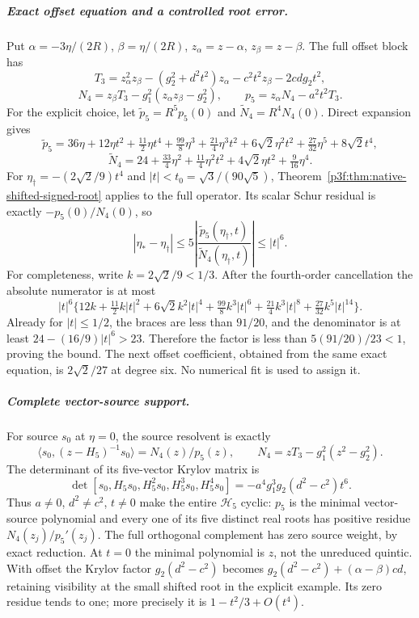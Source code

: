 \documentclass[11pt,a4paper]{article}
\begin{document}
\subparagraph{Exact offset equation and a controlled root error.}
Put \(\alpha=-3\eta/(2R)\), \(\beta=\eta/(2R)\),
\(z_\alpha=z-\alpha\), \(z_\beta=z-\beta\). The full offset block has
\[
 T_3=z_\alpha^2z_\beta-(g_2^2+d^2t^2)z_\alpha
                   -c^2t^2z_\beta-2cdg_2t^2,
\]
\[
 N_4=z_\beta T_3-g_1^2(z_\alpha z_\beta-g_2^2),\qquad
 p_5=z_\alpha N_4-a^2t^2T_3.
\]
For the explicit choice, let \(\widetilde p_5=R^5p_5(0)\) and
\(\widetilde N_4=R^4N_4(0)\). Direct expansion gives
\[
 \widetilde p_5=
 36\eta+12\eta t^2+\tfrac{11}{2}\eta t^4
 +\tfrac{99}{8}\eta^3+\tfrac{21}{4}\eta^3t^2
 +6\sqrt2\eta^2t^2+\tfrac{27}{32}\eta^5+8\sqrt2t^4,
\]
\[
 \widetilde N_4=24+\tfrac{33}{4}\eta^2+\tfrac{11}{4}\eta^2t^2
                     +4\sqrt2\eta t^2+\tfrac9{16}\eta^4.
\]
For \(\eta_{\dagger}=-(2\sqrt2/9)t^4\) and
\(|t|<t_0=\sqrt3/(90\sqrt5)\), Theorem~\ref{p3f:thm:native-shifted-signed-root}
applies to the full operator. Its scalar Schur residual is exactly
\(-p_5(0)/N_4(0)\), so
\begin{equation}
 |\eta_*-\eta_{\dagger}|\le
 5\left|\frac{\widetilde p_5(\eta_{\dagger},t)}
                  {\widetilde N_4(\eta_{\dagger},t)}\right|
 \le |t|^6.
 \label{p3f:eq:native-mixed-root-sixth-bound}
\end{equation}
For completeness, write \(k=2\sqrt2/9<1/3\). After the fourth-order
cancellation the absolute numerator is at most
\[
 |t|^6\{12k+\tfrac{11}{2}k|t|^2+6\sqrt2k^2|t|^4
 +\tfrac{99}{8}k^3|t|^6+\tfrac{21}{4}k^3|t|^8
 +\tfrac{27}{32}k^5|t|^{14}\}.
\]
Already for \(|t|\le1/2\), the braces are less than \(91/20\), and
the denominator is at least \(24-(16/9)|t|^6>23\).
Therefore the factor is less than \(5(91/20)/23<1\), proving the bound.
The next offset coefficient, obtained from the same exact equation, is
\(2\sqrt2/27\) at degree six. No numerical fit is used to assign it.

\subparagraph{Complete vector-source support.}
For source \(s_0\) at \(\eta=0\), the source resolvent is exactly
\begin{equation}
 \langle s_0,(z-H_5)^{-1}s_0\rangle=N_4(z)/p_5(z),\qquad
 N_4=zT_3-g_1^2(z^2-g_2^2).
 \label{p3f:eq:native-mixed-cyclic-resolvent}
\end{equation}
The determinant of its five-vector Krylov matrix is
\[
 \det[s_0,H_5s_0,H_5^2s_0,H_5^3s_0,H_5^4s_0]
 =-a^4g_1^3g_2(d^2-c^2)t^6.
\]
Thus \(a\ne0\), \(d^2\ne c^2\), \(t\ne0\) make the entire
\(\mathcal H_5\) cyclic: \(p_5\) is the minimal vector-source
polynomial and every one of its five distinct real roots has positive
residue \(N_4(z_j)/p_5'(z_j)\). The full orthogonal complement has
zero source weight, by exact reduction. At \(t=0\) the minimal
polynomial is \(z\), not the unreduced quintic. With offset the Krylov
factor \(g_2(d^2-c^2)\) becomes
\(g_2(d^2-c^2)+(\alpha-\beta)cd\), retaining visibility at the small
shifted root in the explicit example. Its zero residue tends to one;
more precisely it is \(1-t^2/3+O(t^4)\).
\end{document}
